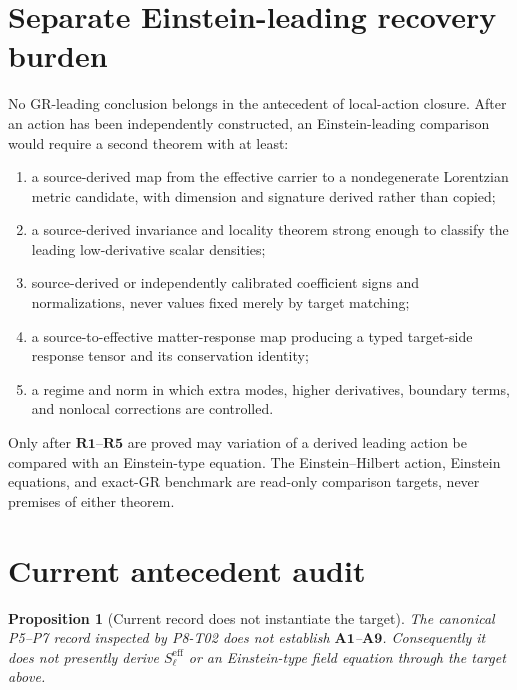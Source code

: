 \documentclass[11pt]{article}
\newtheorem{proposition}{Proposition}
\newcommand{\Seff}{S_{\ell}^{\mathrm{eff}}}
\begin{document}
\section{Separate Einstein-leading recovery burden}

No GR-leading conclusion belongs in the antecedent of local-action closure.
After an action has been independently constructed, an Einstein-leading
comparison would require a second theorem with at least:
\begin{enumerate}
\item[\(\mathbf{R1}\)] a source-derived map from the effective carrier to a
nondegenerate Lorentzian metric candidate, with dimension and signature
derived rather than copied;
\item[\(\mathbf{R2}\)] a source-derived invariance and locality theorem strong
enough to classify the leading low-derivative scalar densities;
\item[\(\mathbf{R3}\)] source-derived or independently calibrated coefficient
signs and normalizations, never values fixed merely by target matching;
\item[\(\mathbf{R4}\)] a source-to-effective matter-response map producing a
typed target-side response tensor and its conservation identity;
\item[\(\mathbf{R5}\)] a regime and norm in which extra modes, higher
derivatives, boundary terms, and nonlocal corrections are controlled.
\end{enumerate}
Only after \(\mathbf{R1}\)--\(\mathbf{R5}\) are proved may variation of a
derived leading action be compared with an Einstein-type equation.  The
Einstein--Hilbert action, Einstein equations, and exact-GR benchmark are
read-only comparison targets, never premises of either theorem.

\section{Current antecedent audit}

\begin{proposition}[Current record does not instantiate the target]
The canonical P5--P7 record inspected by P8-T02 does not establish
\(\mathbf{A1}\)--\(\mathbf{A9}\).  Consequently it does not presently derive
\(\Seff\) or an Einstein-type field equation through the target above.
\end{proposition}
\end{document}
